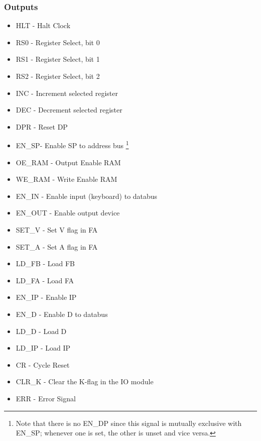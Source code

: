 \subsubsection*{Outputs}
\begin{itemize}
\itemsep0em 
\item HLT - Halt Clock
\item RS0 - Register Select, bit 0
\item RS1 - Register Select, bit 1
\item RS2 - Register Select, bit 2
\item INC - Increment selected register
\item DEC - Decrement selected register
\item DPR - Reset DP
\item EN\_SP- Enable SP to address bus \footnote{Note that there is no EN\_DP since this signal is mutually exclusive with EN\_SP; whenever one is set, the other is unset and vice versa.}
\item OE\_RAM - Output Enable RAM
\item WE\_RAM - Write Enable RAM
\item EN\_IN - Enable input (keyboard) to databus
\item EN\_OUT - Enable output device
\item SET\_V - Set V flag in FA
\item SET\_A - Set A flag in FA
\item LD\_FB - Load FB
\item LD\_FA - Load FA
\item EN\_IP - Enable IP
\item EN\_D - Enable D to databus
\item LD\_D - Load D
\item LD\_IP - Load IP
\item CR - Cycle Reset
\item CLR\_K - Clear the K-flag in the IO module
\item ERR - Error Signal
\end{itemize}


